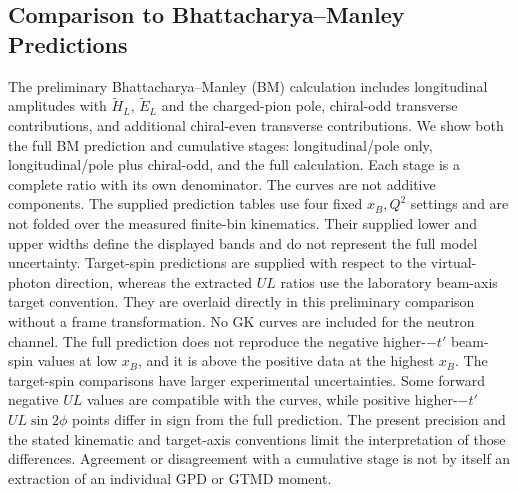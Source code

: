 \subsection{Comparison to Bhattacharya--Manley Predictions}\label{sec:mb_comparison}
The preliminary Bhattacharya--Manley (BM) calculation includes longitudinal amplitudes with $\widetilde H_L$, $\widetilde E_L$ and the charged-pion pole, chiral-odd transverse contributions, and additional chiral-even transverse contributions. We show both the full BM prediction and cumulative stages: longitudinal/pole only, longitudinal/pole plus chiral-odd, and the full calculation. Each stage is a complete ratio with its own denominator. The curves are not additive components.
The supplied prediction tables use four fixed $x_B,Q^2$ settings and are not folded over the measured finite-bin kinematics. Their supplied lower and upper widths define the displayed bands and do not represent the full model uncertainty. Target-spin predictions are supplied with respect to the virtual-photon direction, whereas the extracted $UL$ ratios use the laboratory beam-axis target convention. They are overlaid directly in this preliminary comparison without a frame transformation. No GK curves are included for the neutron channel.
The full prediction does not reproduce the negative higher-$-t'$ beam-spin values at low $x_B$, and it is above the positive data at the highest $x_B$. The target-spin comparisons have larger experimental uncertainties. Some forward negative $UL$ values are compatible with the curves, while positive higher-$-t'$ $UL\sin2\phi$ points differ in sign from the full prediction. The present precision and the stated kinematic and target-axis conventions limit the interpretation of those differences. Agreement or disagreement with a cumulative stage is not by itself an extraction of an individual GPD or GTMD moment.

